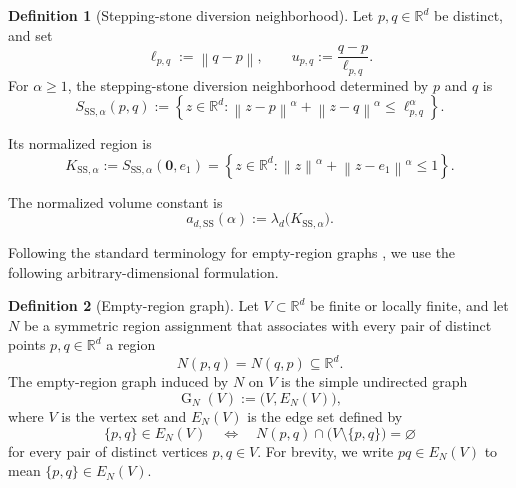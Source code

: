 \documentclass[a4paper,fleqn]{cas-dc}
\theoremstyle{definition}
\newtheorem{definition}{Definition}
\theoremstyle{remark}
\newcommand{\R}{\mathds{R}}
\newcommand{\norm}[1]{\left\lVert #1\right\rVert}
\newcommand{\set}[1]{\left\{#1\right\}}
\newcommand{\ellpq}{\ell_{p,q}}
\newcommand{\upq}{u_{p,q}}
\newcommand{\0}{\mathbf{0}}
\DeclareMathOperator{\G}{G}
\begin{document}
\begin{definition}[Stepping-stone diversion neighborhood]
Let $p,q\in\R^d$ be distinct, and set
\begin{equation}
    \ellpq:=\norm{q-p},
    \qquad
    \upq:=\frac{q-p}{\ellpq}.
\end{equation}
For $\alpha\geq1$, the stepping-stone diversion neighborhood determined by
$p$ and $q$ is
\begin{equation}\label{eq:ss-region}
    S_{\mathrm{SS},\alpha}(p,q)
    :=
    \set{
        z\in\R^d:
        \norm{z-p}^{\alpha}
        +
        \norm{z-q}^{\alpha}
        \leq
        \ellpq^{\alpha}
    }.
\end{equation}


Its normalized region is
\begin{equation}\label{eq:unit-region}
    K_{\mathrm{SS},\alpha}
    :=
    S_{\mathrm{SS},\alpha}(\0,e_1)
    =
    \set{
        z\in\R^d:
        \norm{z}^{\alpha}
        +
        \norm{z-e_1}^{\alpha}
        \leq1
    }.
\end{equation}
\end{definition}


The normalized volume constant is
\begin{equation}
    a_{d,\mathrm{SS}}(\alpha)
    :=
    \lambda_d\bigl(K_{\mathrm{SS},\alpha}\bigr).
\end{equation}


Following the standard terminology for empty-region graphs
\citep{devroye1988expected,cardinal2009empty}, we use the following
arbitrary-dimensional formulation.

\begin{definition}[Empty-region graph]
Let $V\subset\R^d$ be finite or locally finite, and let $N$ be a symmetric
region assignment that associates with every pair of distinct points
$p,q\in\R^d$ a region
\begin{equation}
N(p,q)=N(q,p)\subseteq\R^d.
\end{equation}
The empty-region graph induced by $N$ on $V$ is the simple undirected graph
\begin{equation}
\G_N(V):=\bigl(V,E_N(V)\bigr),
\end{equation}
where $V$ is the vertex set and $E_N(V)$ is the edge set defined by
\begin{equation}
\{p,q\}\in E_N(V)
\quad\Longleftrightarrow\quad
N(p,q)\cap\bigl(V\setminus\{p,q\}\bigr)=\varnothing
\end{equation}
for every pair of distinct vertices $p,q\in V$. For brevity, we write
$ pq\in E_N(V)$ to mean $\{p,q\}\in E_N(V)$.
\end{definition}
\end{document}
